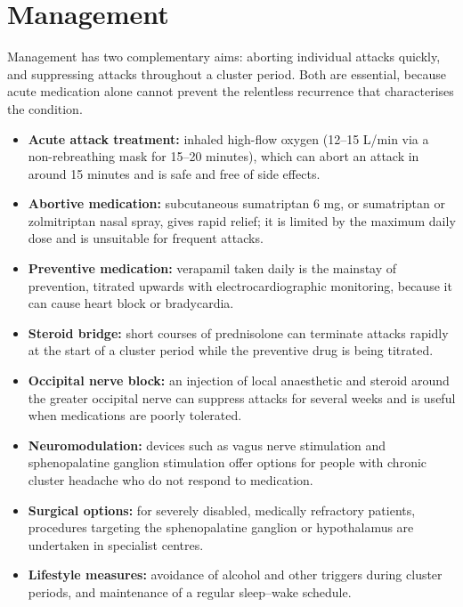 \section*{Management}
Management has two complementary aims: aborting individual attacks quickly, and suppressing attacks throughout a cluster period. Both are essential, because acute medication alone cannot prevent the relentless recurrence that characterises the condition.
\begin{itemize}
    \item \textbf{Acute attack treatment:} inhaled high-flow oxygen (12--15 L/min via a non-rebreathing mask for 15--20 minutes), which can abort an attack in around 15 minutes and is safe and free of side effects.
    \item \textbf{Abortive medication:} subcutaneous sumatriptan 6 mg, or sumatriptan or zolmitriptan nasal spray, gives rapid relief; it is limited by the maximum daily dose and is unsuitable for frequent attacks.
    \item \textbf{Preventive medication:} verapamil taken daily is the mainstay of prevention, titrated upwards with electrocardiographic monitoring, because it can cause heart block or bradycardia.
    \item \textbf{Steroid bridge:} short courses of prednisolone can terminate attacks rapidly at the start of a cluster period while the preventive drug is being titrated.
    \item \textbf{Occipital nerve block:} an injection of local anaesthetic and steroid around the greater occipital nerve can suppress attacks for several weeks and is useful when medications are poorly tolerated.
    \item \textbf{Neuromodulation:} devices such as vagus nerve stimulation and sphenopalatine ganglion stimulation offer options for people with chronic cluster headache who do not respond to medication.
    \item \textbf{Surgical options:} for severely disabled, medically refractory patients, procedures targeting the sphenopalatine ganglion or hypothalamus are undertaken in specialist centres.
    \item \textbf{Lifestyle measures:} avoidance of alcohol and other triggers during cluster periods, and maintenance of a regular sleep--wake schedule.
\end{itemize}

